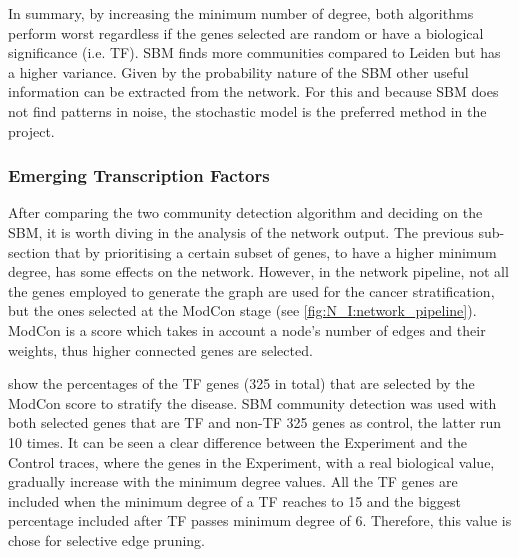 In summary, by increasing the minimum number of degree, both algorithms perform worst regardless if the genes selected are random or have a biological significance (i.e. TF). SBM finds more communities compared to Leiden but has a higher variance. Given by the probability nature of the SBM other useful information can be extracted from the network. For this and because SBM does not find patterns in noise, the stochastic model is the preferred method in the project.



\subsubsection{Emerging Transcription Factors} \label{s:N_I:sel_tfs}


After comparing the two community detection algorithm and deciding on the SBM, it is worth diving in the analysis of the network output. The previous sub-section that by prioritising a certain subset of genes, to have a higher minimum degree, has some effects on the network. However, in the network pipeline, not all the genes employed to generate the graph are used for the cancer stratification, but the ones selected at the ModCon stage (see \cref{fig:N_I:network_pipeline}). ModCon is a score which takes in account a node's number of edges and their weights, thus higher connected genes are selected.

 show the percentages of the TF genes (325 in total) that are selected by the ModCon score to stratify the disease. SBM community detection was used with both selected genes that are TF and non-TF 325 genes as control, the latter run 10 times. It can be seen a clear difference between the Experiment and the Control traces, where the genes in the Experiment, with a real biological value, gradually increase with the minimum degree values. All the TF genes are included when the minimum degree of a TF reaches to 15 and the biggest percentage included after TF passes minimum degree of 6. Therefore, this value is chose for selective edge pruning.


